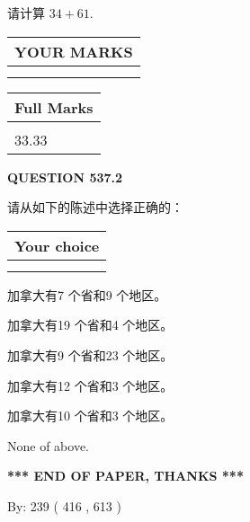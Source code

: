 \documentclass{ctexart}
\begin{document}
  
 
请计算 $ %
34 +  %
61 $.
 

 

 
  
\vspace{0.2in}
  
\noindent\begin{tabular}{|l|}
\hline
 YOUR MARKS  \\
\hline
 \\ 
 \\ 
\hline
\end{tabular}
\hspace{0.05in} \begin{tabular}{|l|}
\hline
 Full Marks  \\
\hline
 \\ 
33.33 \\
\hline
\end{tabular}
{\textbf{\Large{QUESTION
537.2 
}}}
  
  
请从如下的陈述中选择正确的：
  
  
\noindent\hspace{3.0in} \begin{tabular}{|l|}
\hline
Your choice \\
\hline
 \\ 
 \\ 
\hline
\end{tabular}
  
  
 
 
加拿大有7 个省和9 个地区。
 
 
加拿大有19 个省和4 个地区。
 
 
加拿大有9 个省和23 个地区。
 
 
加拿大有12 个省和3 个地区。
 
 
加拿大有10 个省和3 个地区。
 
 
 None of above.
 
 
   
   
 \vspace{0.2in}
 
   
   
   
   
\vspace{1.0in} 
{\textbf{\large{ *** END OF PAPER, THANKS *** }}} 
   
   
\hspace{1.0in} By: 
 239 ( 416 ,  613 )
   
\end{document}
